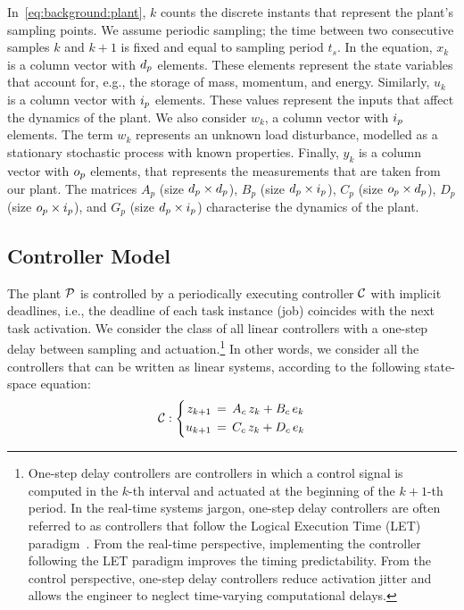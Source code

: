 In~\eqref{eq:background:plant}, $k$ counts the discrete instants that represent the plant's sampling points.
We assume periodic sampling; the time between two consecutive samples $k$ and $k+1$ is fixed and equal to sampling period $t_s$.
In the equation, $x_k$ is a column vector with $d_p$ elements.
These elements represent the state variables that account for, e.g., the storage of mass, momentum, and energy.
Similarly, $u_k$ is a column vector with $i_p$ elements.
These values represent the inputs that affect the dynamics of the plant.
We also consider $w_k$, a column vector with $i_p$ elements.
The term $w_k$ represents an unknown load disturbance, modelled as a stationary stochastic process with known properties.
Finally, $y_k$ is a column vector with $o_p$ elements, that represents the measurements that are taken from our plant.
The matrices $A_p$ (size $d_p \times d_p$), $B_p$ (size $d_p \times i_p$), $C_p$ (size $o_p \times d_p$), $D_p$ (size $o_p \times i_p$), and $G_p$ (size $d_p \times i_p$) characterise the dynamics of the plant.

\subsection{Controller Model}

The plant $\mathcal{P}$ is controlled by a periodically executing controller $\mathcal{C}$ with implicit deadlines, i.e., the deadline of each task instance (job) coincides with the next task activation.
We consider the class of all linear controllers with a one-step delay between sampling and actuation.\footnote{One-step delay controllers are controllers in which a control signal is computed in the $k$-th interval and actuated at the beginning of the $k+1$-th period. In the real-time systems jargon, one-step delay controllers are often referred to as controllers that follow the Logical Execution Time (LET) paradigm~\cite{Kirsch:2012, Ernst:2018}. From the real-time perspective, implementing the controller following the LET paradigm improves the timing predictability. From the control perspective, one-step delay controllers reduce activation jitter and allows the engineer to neglect time-varying computational delays.}
In other words, we consider all the controllers that can be written as linear systems, according to the following state-space equation:
\begin{equation}
\label{eq:background:controller}
    \mathcal{C} : \left\{
    \begin{aligned}
        z_{k+1} &\,=\, A_c\,z_k + B_c\,e_k \\
        u_{k+1} &\,=\, C_c\,z_k + D_c\,e_k
    \end{aligned}
    \right.
\end{equation}

